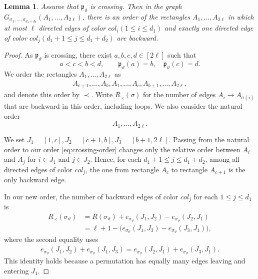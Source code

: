 \documentclass[12pt]{article}
\numberwithin{equation}{section}
\theoremstyle{plain}
\newtheorem{lemma}[theorem]{Lemma}
\begin{document}
\begin{lemma}\label{lem:crossing-order}
Assume that $\mathfrak p_\vartheta$ is crossing. Then in the graph $G_{\sigma_1,\ldots,\sigma_{d_1+d_2}}(A_1,\ldots,A_{2\ell})$, there is an order of the rectangles $A_1,\ldots,A_{2\ell}$ in which at
most $\ell$ directed edges of color $col_i (1 \le i \le d_1)$ and exactly one directed edge of color $col_j (d_1+1 \le j \le d_1+d_2)$ are backward.
\end{lemma}

\begin{proof}
As $\mathfrak p_\vartheta$ is crossing, there exist $a,b,c,d \in [2\ell]$ such that
\[
  a<c<b<d,\qquad \mathfrak p_\vartheta(a)=b,\quad \mathfrak p_\vartheta(c)=d.
\]
We order the rectangles $A_1,\ldots,A_{2\ell}$ as
\begin{align} \label{eq:crossing-order}
A_{c+1}, \ldots, A_b, A_1, \ldots, A_c, A_{b+1}, \ldots, A_{2\ell},
\end{align}
and denote this order by $\prec$. Write $R_\prec(\sigma)$ for the number of edges $A_i\to A_{\sigma(i)}$ that are backward in this order, including loops. We also consider the natural order
\[
A_1, \ldots, A_{2\ell}.
\]

We set $J_1 = [1,c], J_2 = [c+1,b], J_3=[b+1,2\ell]$.
Passing from the natural order to our order
\eqref{eq:crossing-order} changes only the relative order between $A_i$ and $A_j$ for $i \in J_1$ and $j \in J_2$.
Hence, for each $d_1+1 \le j \le d_1+d_2$, among all directed edges of color $col_j$, the one from rectangle $A_c$ to rectangle $A_{c+1}$ is the only backward edge.

In our new order, the number of backward edges of color $col_j$ for each $1 \le j \le d_1$ is
\begin{align*}
    R_\prec(\sigma_\vartheta)
    &=R(\sigma_\vartheta)+e_{\sigma_\vartheta}(J_1,J_2)-e_{\sigma_\vartheta}(J_2,J_1)\\
    &=\ell+1-\bigl(e_{\sigma_\vartheta}(J_1,J_3)-e_{\sigma_\vartheta}(J_3,J_1)\bigr),
\end{align*}
where the second equality uses
\begin{align*}
    e_{\sigma_\vartheta}(J_1,J_2) + e_{\sigma_\vartheta}(J_1,J_3) = e_{\sigma_\vartheta}(J_2,J_1) + e_{\sigma_\vartheta}(J_3,J_1).
\end{align*}
This identity holds because a permutation has equally many edges leaving and entering $J_1$.


\end{proof}
\end{document}
